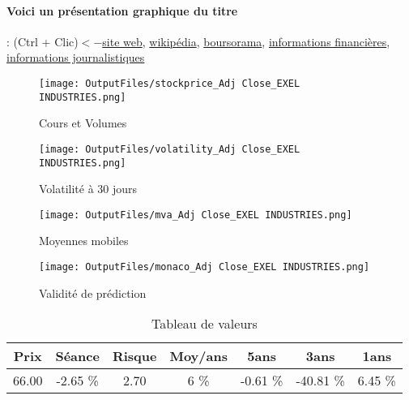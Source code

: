 \documentclass[11pt,a4paper]{report}%
\begin{document}
\paragraph{Voici un présentation graphique du titre} : (Ctrl + Clic)$<-$\href{https://www.exel-industries.com/}{site web}, \href{https://fr.wikipedia.org/wiki/Exel_Industries}{wikipédia}, \href{https://www.boursorama.com/cours/1rPEXE}{boursorama}, \href{https://www.qwant.com/?q=site:https:%2f%2fwww.easybourse.com%2faction-societe%2fEXEL-INDUSTRIES&t=web&client=ext-firefox-hp}{informations financières}, \href{https://bourse.lerevenu.com/cours-de-bourse/fiche-valeur-synthese/EXEL-INDUSTRIES/EXE-FR}{informations journalistiques}
\begin{figure}[!htb]
   \begin{minipage}{0.5\textwidth}
     \centering
     \texttt{[image: OutputFiles/stockprice\_Adj Close\_EXEL INDUSTRIES.png]}
     \caption{Cours et Volumes}\label{Fig:price_EXEL INDUSTRIES}
   \end{minipage}\hfill
   \begin{minipage}{0.5\textwidth}
     \centering
     \texttt{[image: OutputFiles/volatility\_Adj Close\_EXEL INDUSTRIES.png]}
     \caption{Volatilité à 30 jours}\label{Fig:volat_EXEL INDUSTRIES}
   \end{minipage}
\end{figure}
\begin{figure}[!htb]
   \begin{minipage}{0.5\textwidth}
     \centering
     \texttt{[image: OutputFiles/mva\_Adj Close\_EXEL INDUSTRIES.png]}
     \caption{Moyennes mobiles}\label{Fig:mva_EXEL INDUSTRIES}
   \end{minipage}\hfill
   \begin{minipage}{0.5\textwidth}
     \centering
     \texttt{[image: OutputFiles/monaco\_Adj Close\_EXEL INDUSTRIES.png]}
     \caption{Validité de prédiction}\label{Fig:prediction_EXEL INDUSTRIES}
   \end{minipage}
\end{figure}

\begin{table}[H]
  \centering
    \begin{tabular}{|c|c|c|c|c|c|c|}
    \hline
    Prix & Séance & Risque  & Moy/ans & 5ans & 3ans & 1ans \\
    \hline
    66.00 &    -2.65 \%    & 2.70 & 6 \% & -0.61 \% & -40.81 \% & 6.45 \% \\
    \hline
    \end{tabular}%
        \label{tab:table_EXEL INDUSTRIES}%
      \caption{Tableau de valeurs}
\end{table}%
\end{document}
